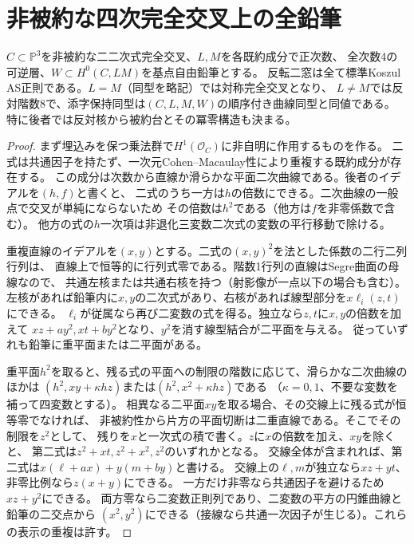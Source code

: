 \section{非被約な四次完全交叉上の全鉛筆}
\label{sec:nonreduced-quartic-pencils}
\begin{theorem}\label{thm:nonreduced-quartic-pencils}
$C\subset\mathbb P^3$を非被約な二二次式完全交叉、$L,M$を各既約成分で正次数、
全次数4の可逆層、$W\subset H^0(C,LM)$を基点自由鉛筆とする。
反転二窓は全て標準Koszul AS正則である。$L=M$（同型を略記）では対称完全交叉となり、
$L\ne M$では反対階数8で、添字保持同型は$(C,L,M,W)$の順序付き曲線同型と同値である。
特に後者では反対核から被約台とその冪零構造も決まる。
\end{theorem}

\begin{proof}
まず埋込みを保つ乗法群で$H^1(\mathcal O_C)$に非自明に作用するものを作る。
二式は共通因子を持たず、一次元Cohen--Macaulay性により重複する既約成分が存在する。
この成分は次数から直線か滑らかな平面二次曲線である。後者のイデアルを$(h,f)$と書くと、
二式のうち一方は$h$の倍数にできる。二次曲線の一般点で交叉が単純にならないため
その倍数は$h^2$である（他方は$f$を非零係数で含む）。
他方の式の$h$一次項は非退化三変数二次式の変数の平行移動で除ける。

重複直線のイデアルを$(x,y)$とする。二式の$(x,y)^2$を法とした係数の二行二列行列は、
直線上で恒等的に行列式零である。階数1行列の直線はSegre曲面の母線なので、
共通左核または共通右核を持つ（射影像が一点以下の場合も含む）。
左核があれば鉛筆内に$x,y$の二次式があり、右核があれば線型部分を$x\ell_i(z,t)$にできる。
$\ell_i$が従属なら再び二変数の式を得る。独立なら$z,t$に$x,y$の倍数を加えて
$xz+a y^2,xt+b y^2$となり、$y^2$を消す線型結合が二平面を与える。
従っていずれも鉛筆に重平面または二平面がある。

重平面$h^2$を取ると、残る式の平面への制限の階数に応じて、滑らかな二次曲線のほかは
$(h^2,xy+\kappa hz)$または$(h^2,x^2+\kappa hz)$である
（$\kappa=0,1$、不要な変数を補って四変数とする）。
相異なる二平面$xy$を取る場合、その交線上に残る式が恒等零でなければ、
非被約性から片方の平面切断は二重直線である。そこでその制限を$z^2$として、
残りを$x$と一次式の積で書く。$z$に$x$の倍数を加え、$xy$を除くと、
第二式は$z^2+xt,z^2+x^2,z^2$のいずれかとなる。
交線全体が含まれれば、第二式は$x(\ell+a x)+y(m+b y)$と書ける。
交線上の$\ell,m$が独立なら$xz+yt$、非零比例なら$z(x+y)$にできる。
一方だけ非零なら共通因子を避けるため$xz+y^2$にできる。
両方零なら二変数正則列であり、二変数の平方の円錐曲線と鉛筆の二交点から
$(x^2,y^2)$にできる（接線なら共通一次因子が生じる）。これらの表示の重複は許す。


\end{proof}
